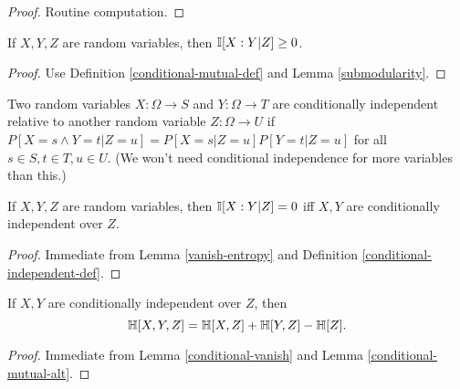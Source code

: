 \begin{proof}\leanok Routine computation.
\end{proof}

\begin{lemma}
\label{conditional-nonneg}
\leanok
If $X,Y,Z$ are random variables, then $\mathbb{I}[X:Y|Z] \ge 0$.
\end{lemma}
\begin{proof}
\leanok
Use Definition \ref{conditional-mutual-def} and Lemma \ref{submodularity}.
\end{proof}

\begin{definition}
\label{conditional-independent-def}
\leanok
  Two random variables $X: \Omega \to S$ and $Y: \Omega \to T$ are conditionally independent relative to another random variable $Z: \Omega \to U$ if $P[ X = s \wedge Y = t| Z=u] = P[X=s|Z=u] P[Y=t|Z=u]$ for all $s \in S, t \in T, u \in U$.  (We won't need conditional independence for more variables than this.)
\end{definition}

\begin{lemma}\label{conditional-vanish}
  \leanok
  If $X,Y,Z$ are random variables, then $\mathbb{I}[X:Y|Z] = 0$ iff $X,Y$ are conditionally independent over $Z$.
\end{lemma}

\begin{proof}  Immediate from Lemma \ref{vanish-entropy} and Definition \ref{conditional-independent-def}.
\end{proof}

\begin{corollary}\label{cond-trial-ent}
  \leanok
  If $X, Y$ are conditionally independent over $Z$, then
  $$ \mathbb{H}[X,Y,Z] =\mathbb{H}[X,Z] + \mathbb{H}[Y,Z] - \mathbb{H}[Z].$$
\end{corollary}

\begin{proof} \leanok Immediate from Lemma \ref{conditional-vanish} and Lemma \ref{conditional-mutual-alt}.
\end{proof}
